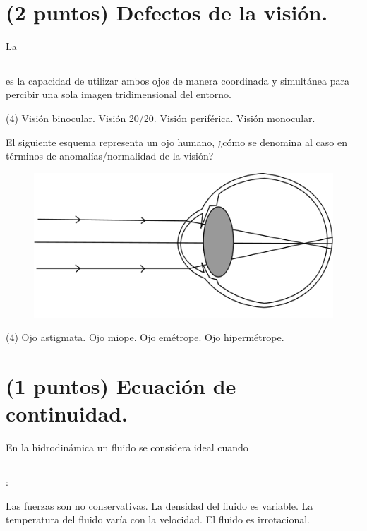 \documentclass[12pt, letter]{exam}
\begin{document}
\begin{questions}
    \section{(2 puntos) Defectos de la visión.}
    
    \question  La \rule{2cm}{0.1mm} es la capacidad de utilizar ambos ojos de manera coordinada y simultánea para percibir una sola imagen tridimensional del entorno.
    \begin{tasks}(4)
        \task Visión binocular.
        \task Visión 20/20.
        \task Visión periférica.
        \task Visión monocular.
    \end{tasks}
    \question El siguiente esquema representa un ojo humano, ¿cómo se denomina al caso en términos de anomalías/normalidad de la visión?
    \begin{figure}[H]
        \centering
        \includegraphics[scale=0.3]{Imagenes/Defectos_Vision_03.png}
    \end{figure}
    \begin{tasks}(4)
        \task Ojo astigmata.
        \task Ojo miope.
        \task Ojo emétrope.
        \task Ojo hipermétrope.
    \end{tasks}

    \section{(1 puntos) Ecuación de continuidad.}

    \question En la hidrodinámica un fluido se considera ideal cuando \rule{2cm}{0.1mm}:
    \begin{tasks}
        \task Las fuerzas son no conservativas.
        \task La densidad del fluido es variable.
        \task La temperatura del fluido varía con la velocidad.
        \task El fluido es irrotacional.
    \end{tasks}


\end{questions}
\end{document}
